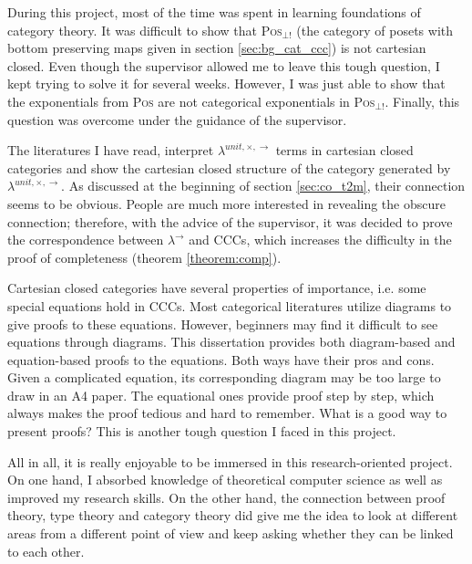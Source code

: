 During this project, most of the time was spent in learning foundations of category theory. It was difficult to show that \textsc{Pos}$_{\bot !}$ (the category of posets with bottom preserving maps given in section \ref{sec:bg_cat_ccc}) is not cartesian closed. Even though the supervisor allowed me to leave this tough question, I kept trying to solve it for several weeks. However, I was just able to show that the exponentials from \textsc{Pos} are not categorical exponentials in \textsc{Pos}$_{\bot !}$. Finally, this question was overcome under the guidance of the supervisor.

The literatures \cite{AL91,BW95,LS86,Mit96} I have read, interpret $ \lambda^{unit,\times,\to} $ terms in cartesian closed categories and show the cartesian closed structure of the category generated by $ \lambda^{unit,\times,\to} $. As discussed at the beginning of section \ref{sec:co_t2m}, their connection seems to be obvious. People are much more interested in revealing the obscure connection; therefore, with the advice of the supervisor, it was decided to prove the correspondence between $ \lambda^{\to} $ and CCCs, which increases the difficulty in the proof of completeness (theorem \ref{theorem:comp}).

Cartesian closed categories have several properties of importance, i.e. some special equations hold in CCCs. Most categorical literatures utilize diagrams to give proofs to these equations. However, beginners may find it difficult to see equations through diagrams. This dissertation provides both diagram-based and equation-based proofs to the equations. Both ways have their pros and cons. Given a complicated equation, its corresponding diagram may be too large to draw in an A4 paper. The equational ones provide proof step by step, which always makes the proof tedious and hard to remember. What is a good way to present proofs? This is another tough question I faced in this project.

All in all, it is really enjoyable to be immersed in this research-oriented project. On one hand, I absorbed knowledge of theoretical computer science as well as improved my research skills. On the other hand, the connection between proof theory, type theory and category theory did give me the idea to look at different areas from a different point of view and keep asking whether they can be linked to each other.